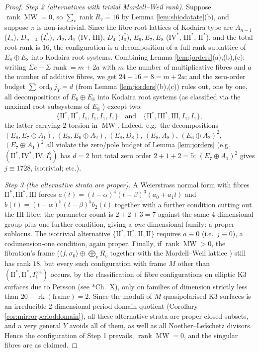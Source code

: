 \documentclass[11pt]{amsart}
\theoremstyle{plain}
\theoremstyle{definition}
\begin{document}
\begin{proof}
\emph{Step 2 (alternatives with trivial Mordell--Weil rank).} Suppose
$\operatorname{rank}\operatorname{MW}=0$, so
$\sum_v\operatorname{rank}R_v=16$ by Lemma \ref{lem:shiodatate}(b), and
suppose $\pi$ is non-isotrivial. Since the fibre root lattices of Kodaira type
are $A_{n-1}$ ($I_n$), $D_{n+4}$ ($I_n^*$), $A_2,A_1$ ($\mathrm{IV}$,
$\mathrm{III}$), $D_4$ ($I_0^*$), $E_6,E_7,E_8$ ($\mathrm{IV}^*$,
$\mathrm{III}^*$, $\mathrm{II}^*$), and the total root rank is $16$, the
configuration is a decomposition of a full-rank sublattice of
$E_8\oplus E_8$ into Kodaira root systems. Combining
Lemma \ref{lem:jorders}(a),(b),(c): writing
$\Sigma e-\Sigma\operatorname{rank}=m+2a$ with $m$ the number of
multiplicative fibres and $a$ the number of additive fibres, we get
$24-16=8=m+2a$; and the zero-order budget $\sum\operatorname{ord}_0j_Y=d$
(from Lemma \ref{lem:jorders}(b),(c)) rules out, one by one, all decompositions
of $E_8\oplus E_8$ into Kodaira root systems (as classified via the maximal
root subsystems of $E_8$ \cite{Dyn57}) except two:
\[
\{\mathrm{II}^*,\mathrm{II}^*,I_1,I_1,I_1,I_1\}
\quad\text{and}\quad
\{\mathrm{II}^*,\mathrm{III}^*,\mathrm{III},I_1,I_1\},
\]
the latter carrying $2$-torsion in $\operatorname{MW}$. Indeed, e.g.\ the
decompositions $(E_8,E_7\!\oplus\!A_1)$, $(E_8,E_6\!\oplus\!A_2)$,
$(E_8,D_8)$, $(E_8,A_8)$, $(E_6\!\oplus\!A_2)^2$,
$(E_7\!\oplus\!A_1)^2$ all violate the zero/pole budget of
Lemma \ref{lem:jorders} (e.g.\ $(\mathrm{II}^*,\mathrm{IV}^*,\mathrm{IV},I_1^2)$
has $d=2$ but total zero order $2+1+2=5$; $(E_7\oplus A_1)^2$ gives $j\equiv
1728$, isotrivial; etc.).

\emph{Step 3 (the alternative strata are proper).} A Weierstrass normal form
with fibres $\mathrm{II}^*,\mathrm{III}^*,\mathrm{III}$ forces
$a(t)=(t-\alpha)^4(t-\beta)^3(a_0+a_1t)$ and
$b(t)=(t-\alpha)^5(t-\beta)^5b_2(t)$ together with a further condition cutting
out the $\mathrm{III}$ fibre; the parameter count is $2+2+3=7$ against the same
$4$-dimensional group plus one further condition, giving a
\emph{one}-dimensional family: a proper sublocus. The isotrivial alternative
$\{\mathrm{II}^*,\mathrm{II}^*,\mathrm{II},\mathrm{II}\}$ requires $a\equiv0$
(i.e.\ $j\equiv0$), a codimension-one condition, again proper. Finally, if
$\operatorname{rank}\operatorname{MW}>0$, the fibration's frame
($\langle f,\sigma_0\rangle\oplus\bigoplus_v R_v$ together with the
Mordell--Weil lattice \cite{Shi72}) still has rank $18$, but every such
configuration with frame $M$ other than
$(\mathrm{II}^*,\mathrm{II}^*,I_1^{\times4})$ occurs, by the classification of
fibre configurations on elliptic K3 surfaces due to Persson
\cite{Per85} (see \cite{Mir89}*{Ch.~X}), only on families of dimension strictly
less than $20-\operatorname{rk}(\text{frame})=2$. Since the moduli of
$M$-quasipolarised K3 surfaces is an irreducible $2$-dimensional period domain
quotient (Corollary \ref{cor:mirrorperioddomain}), all these alternative strata
are proper closed subsets, and a very general $Y$ avoids all of them, as well
as all Noether--Lefschetz divisors. Hence the configuration of
Step 1 prevails, $\operatorname{rank}\operatorname{MW}=0$, and the singular
fibres are as claimed.
\end{proof}
\end{document}
